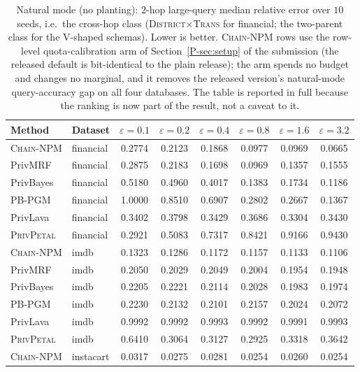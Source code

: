 \documentclass[sigconf, nonacm]{acmart}
\newcommand{\chainnpm}{\textsc{Chain-NPM}\xspace}
\newcommand{\privpetal}{\textsc{PrivPetal}\xspace}
\newcommand{\psec}[1]{Section~\ref{P-sec:#1} of the submission}
\begin{document}
\begin{table}[t]
\centering
\caption{Natural mode (no planting): $2$-hop large-query median relative
error over $10$ seeds, i.e.\ the cross-hop class
(\textsc{District}$\times$\textsc{Trans} for financial; the two-parent class
for the V-shaped schemas). Lower is better. \chainnpm{} rows use the
row-level quota-calibration arm of \psec{setup} (the released
default is bit-identical to the plain release); the arm spends no budget and
changes no marginal, and it removes the released version's natural-mode
query-accuracy gap on all four databases. The table is reported in full
because the ranking is now part of the result, not a caveat to it.}
\label{tab:re-appendix}
\small
\begin{tabular}{@{}llcccccc@{}}
\toprule
Method & Dataset & $\varepsilon{=}0.1$ & $\varepsilon{=}0.2$ & $\varepsilon{=}0.4$ & $\varepsilon{=}0.8$ & $\varepsilon{=}1.6$ & $\varepsilon{=}3.2$ \\
\midrule
\chainnpm & financial & 0.2774 & 0.2123 & 0.1868 & 0.0977 & 0.0969 & 0.0665 \\
PrivMRF & financial & 0.2875 & 0.2183 & 0.1698 & 0.0969 & 0.1357 & 0.1555 \\
PrivBayes & financial & 0.5180 & 0.4960 & 0.4017 & 0.1383 & 0.1734 & 0.1186 \\
PB-PGM & financial & 1.0000 & 0.8510 & 0.6907 & 0.2802 & 0.2667 & 0.1367 \\
PrivLava & financial & 0.3402 & 0.3798 & 0.3429 & 0.3686 & 0.3304 & 0.3430 \\
\privpetal & financial & 0.2921 & 0.5083 & 0.7317 & 0.8421 & 0.9166 & 0.9430 \\
\midrule
\chainnpm & imdb & 0.1323 & 0.1286 & 0.1172 & 0.1157 & 0.1133 & 0.1106 \\
PrivMRF & imdb & 0.2050 & 0.2029 & 0.2049 & 0.2004 & 0.1954 & 0.1948 \\
PrivBayes & imdb & 0.2205 & 0.2221 & 0.2114 & 0.2028 & 0.1983 & 0.1974 \\
PB-PGM & imdb & 0.2230 & 0.2132 & 0.2101 & 0.2157 & 0.2024 & 0.2072 \\
PrivLava & imdb & 0.9992 & 0.9992 & 0.9993 & 0.9992 & 0.9991 & 0.9993 \\
\privpetal & imdb & 0.6410 & 0.3064 & 0.3127 & 0.2925 & 0.3318 & 0.3642 \\
\midrule
\chainnpm & instacart & 0.0317 & 0.0275 & 0.0281 & 0.0254 & 0.0260 & 0.0254 \\

\end{tabular}
\end{table}
\end{document}
